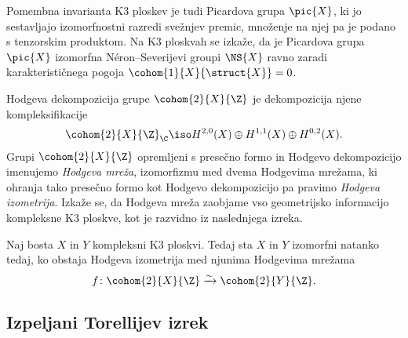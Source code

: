 Pomembna invarianta K3 ploskev je tudi Picardova grupa $\pic{X}$, ki jo sestavljajo izomorfnostni razredi svežnjev premic, množenje na njej pa je podano s tenzorskim produktom. Na K3 ploskvah se izkaže, da je Picardova grupa $\pic{X}$ izomorfna Néron--Severijevi groupi $\NS{X}$ ravno zaradi karakterističnega pogoja $\cohom{1}{X}{\struct{X}} = 0$. 

Hodgeva dekompozicija grupe $\cohom{2}{X}{\Z}$ je dekompozicija njene kompleksifikacije
\[
    \cohom{2}{X}{\Z}_\C \iso H^{2,0}(X) \oplus H^{1,1}(X) \oplus H^{0,2}(X).
\]
Grupi $\cohom{2}{X}{\Z}$ opremljeni s presečno formo in Hodgevo dekompozicijo imenujemo \emph{Hodgeva mreža}, izomorfizmu med dvema Hodgevima mrežama, ki ohranja tako presečno formo kot Hodgevo dekompozicijo pa pravimo \emph{Hodgeva izometrija}. Izkaže se, da Hodgeva mreža zaobjame vso geometrijsko informacijo kompleksne K3 ploskve, kot je razvidno iz naslednjega izreka. 

\begin{izrek}
    Naj bosta $X$ in $Y$ kompleksni K3 ploskvi. Tedaj sta $X$ in $Y$ izomorfni natanko tedaj, ko obstaja Hodgeva izometrija med njunima Hodgevima mrežama
    \[
        f\colon \cohom{2}{X}{\Z} \xrightarrow{\sim} \cohom{2}{Y}{\Z}.
    \]
\end{izrek}


\subsection*{Izpeljani Torellijev izrek}


